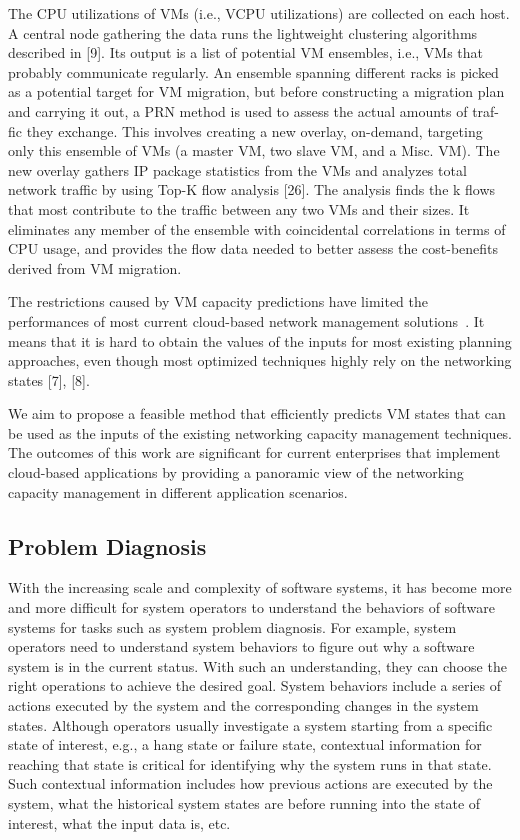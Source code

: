 The CPU utilizations of VMs (i.e., VCPU utilizations) are collected on each host. A central node gathering the data runs the lightweight clustering algorithms described in [9]. Its output is a list of potential VM ensembles, i.e., VMs that probably communicate regularly. An ensemble spanning different racks is picked as a potential target for VM migration, but before constructing a migration plan and carrying it out, a PRN method is used to assess the actual amounts of traf- fic they exchange. This involves creating a new overlay, on-demand, targeting only this ensemble of VMs (a master VM, two slave VM, and a Misc. VM). The new overlay gathers IP package statistics from the VMs and analyzes total network traffic by using Top-K flow analysis [26]. The analysis finds the k flows that most contribute to the traffic between any two VMs and their sizes. It eliminates any member of the ensemble with coincidental correlations in terms of CPU usage, and provides the flow data needed to better assess the cost-benefits derived from VM migration.

 
 
 The restrictions caused by VM capacity predictions have limited the performances of most current cloud-based network management solutions~\cite{Sun2016}. It means that it is hard to obtain the values of the inputs for most existing planning approaches, even though most optimized techniques highly rely on the networking states [7], [8]. 
 
 We aim to propose a feasible method that efficiently predicts VM states that can be used as the inputs of the existing networking capacity management techniques. The outcomes of this work are significant for current enterprises that implement cloud-based applications by providing a panoramic view of the networking capacity management in different application scenarios.
 
 



\subsection{Problem Diagnosis}
With the increasing scale and complexity of software
systems, it has become more and more difficult for system operators to understand the behaviors of software systems for tasks such as system problem diagnosis. For example, system operators need to understand system behaviors to figure out why a software system is in the current status. With such an understanding, they can choose the right operations to achieve the desired goal. System behaviors include a series of actions executed by the system and the corresponding changes in the system states. Although operators usually investigate a system starting from a specific state of interest, e.g., a hang state or failure state, contextual information for reaching that state is critical for identifying why the system runs in that state. Such contextual information includes how previous actions are executed by the system, what the historical system states are before running into the state of interest, what the input data is, etc.


